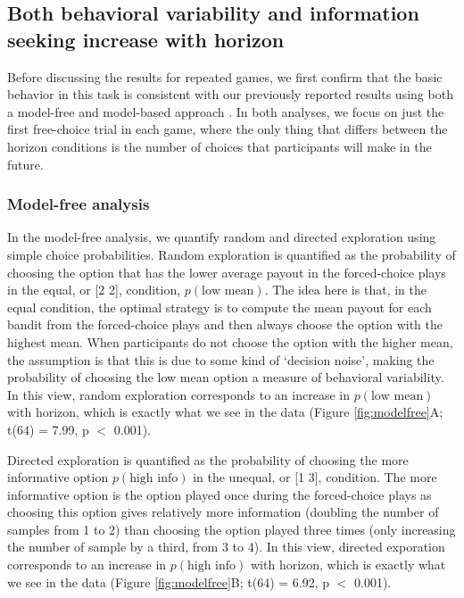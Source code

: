 \documentclass[12pt]{article}
\begin{document}
{	\subsection*{Both behavioral variability and information seeking increase with horizon}
	Before discussing the results for repeated games, we first confirm that the basic behavior in this task is consistent with our previously reported results using both a model-free and model-based approach \citep{wilson2014}. In both analyses, we focus on just the first free-choice trial in each game, where the only thing that differs between the horizon conditions is the number of choices that participants will make in the future. 
	
	\subsubsection*{Model-free analysis}
	In the model-free analysis, we quantify random and directed exploration using simple choice probabilities. Random exploration is quantified as the probability of choosing the option that has the lower average payout in the forced-choice plays in the equal, or [2 2], condition, $p(\mbox{low mean})$. The idea here is that, in the equal condition, the optimal strategy is to compute the mean payout for each bandit from the forced-choice plays and then always choose the option with the highest mean. When participants do not choose the option with the higher mean, the assumption is that this is due to some kind of `decision noise', making the probability of choosing the low mean option a measure of behavioral variability. In this view, random exploration corresponds to an increase in $p(\mbox{low mean})$ with horizon, which is exactly what we see in the data (Figure \ref{fig:modelfree}A; t(64) = 7.99, p $<$ 0.001).
	
	Directed exploration is quantified as the probability of choosing the more informative option $p(\mbox{high info})$ in the unequal, or [1 3], condition. The more informative option is the option played once during the forced-choice plays as choosing this option gives relatively more information (doubling the number of samples from 1 to 2) than choosing the option played three times (only increasing the number of sample by a third, from 3 to 4). In this view, directed exporation corresponds to an increase in $p(\mbox{high info})$ with horizon, which is exactly what we see in the data (Figure \ref{fig:modelfree}B; t(64) = 6.92, p $<$ 0.001).
	
}
\end{document}
